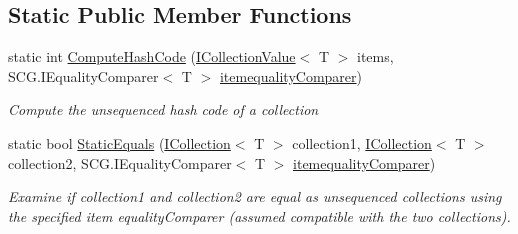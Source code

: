 \subsection*{Static Public Member Functions}
\begin{DoxyCompactItemize}
\item 
static int \hyperlink{class_c5_1_1_collection_base_ace9e9e72f14e465b9db074a539a80079}{Compute\+Hash\+Code} (\hyperlink{interface_c5_1_1_i_collection_value}{I\+Collection\+Value}$<$ T $>$ items, S\+C\+G.\+I\+Equality\+Comparer$<$ T $>$ \hyperlink{class_c5_1_1_collection_base_a95e343400be0e8f3f8d6310f1aaf2cc6}{itemequality\+Comparer})
\begin{DoxyCompactList}\small\item\em Compute the unsequenced hash code of a collection \end{DoxyCompactList}\item 
static bool \hyperlink{class_c5_1_1_collection_base_a2c019fdab3aee23b89421b4080b3cb9f}{Static\+Equals} (\hyperlink{interface_c5_1_1_i_collection}{I\+Collection}$<$ T $>$ collection1, \hyperlink{interface_c5_1_1_i_collection}{I\+Collection}$<$ T $>$ collection2, S\+C\+G.\+I\+Equality\+Comparer$<$ T $>$ \hyperlink{class_c5_1_1_collection_base_a95e343400be0e8f3f8d6310f1aaf2cc6}{itemequality\+Comparer})
\begin{DoxyCompactList}\small\item\em Examine if collection1 and collection2 are equal as unsequenced collections using the specified item equality\+Comparer (assumed compatible with the two collections). \end{DoxyCompactList}\end{DoxyCompactItemize}
